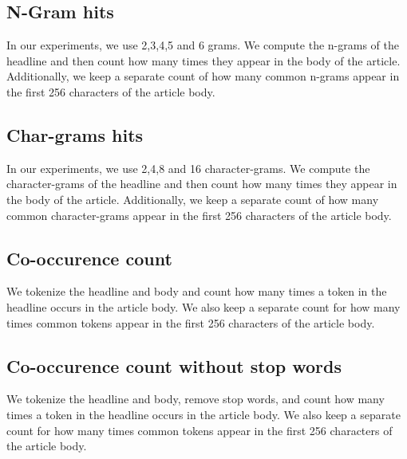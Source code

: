 \documentclass[11pt]{extarticle}
\begin{document}
\subsection{N-Gram hits}
In our experiments, we use 2,3,4,5 and 6 grams. We compute the n-grams of the headline and then count how many times they appear in the body of the article. Additionally, we keep a separate count of how many common n-grams appear in the first 256 characters of the article body.

\subsection{Char-grams hits}
In our experiments, we use 2,4,8 and 16 character-grams. We compute the character-grams of the headline and then count how many times they appear in the body of the article. Additionally, we keep a separate count of how many common character-grams appear in the first 256 characters of the article body.

\subsection{Co-occurence count}
We tokenize the headline and body and count how many times a token in the headline occurs in the article body. We also keep a separate count for how many times common tokens appear in the first 256 characters of the article body.

\subsection{Co-occurence count without stop words}
We tokenize the headline and body, remove stop words, and count how many times a token in the headline occurs in the article body. We also keep a separate count for how many times common tokens appear in the first 256 characters of the article body.
\end{document}
